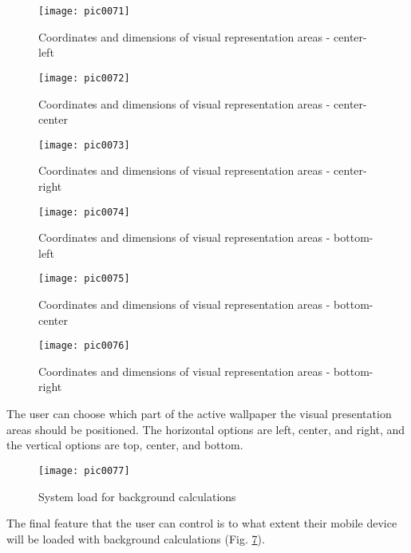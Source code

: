 \begin{figure}[h]
\centering
\texttt{[image: pic0071]}
\caption{Coordinates and dimensions of visual representation areas - center-left}
\label{fig:pic0071}
\end{figure}
\FloatBarrier

\begin{figure}[h]
\centering
\texttt{[image: pic0072]}
\caption{Coordinates and dimensions of visual representation areas - center-center}
\label{fig:pic0072}
\end{figure}
\FloatBarrier

\begin{figure}[h]
\centering
\texttt{[image: pic0073]}
\caption{Coordinates and dimensions of visual representation areas - center-right}
\label{fig:pic0073}
\end{figure}
\FloatBarrier

\begin{figure}[h]
\centering
\texttt{[image: pic0074]}
\caption{Coordinates and dimensions of visual representation areas - bottom-left}
\label{fig:pic0074}
\end{figure}
\FloatBarrier

\begin{figure}[h]
\centering
\texttt{[image: pic0075]}
\caption{Coordinates and dimensions of visual representation areas - bottom-center}
\label{fig:pic0075}
\end{figure}
\FloatBarrier

\begin{figure}[h]
\centering
\texttt{[image: pic0076]}
\caption{Coordinates and dimensions of visual representation areas - bottom-right}
\label{fig:pic0076}
\end{figure}
\FloatBarrier

The user can choose which part of the active wallpaper the visual presentation areas should be positioned. The horizontal options are left, center, and right, and the vertical options are top, center, and bottom.

\begin{figure}[h]
\centering
\texttt{[image: pic0077]}
\caption{System load for background calculations}
\label{fig:pic0077}
\end{figure}
\FloatBarrier

The final feature that the user can control is to what extent their mobile device will be loaded with background calculations (Fig. \ref{fig:pic0077}).

